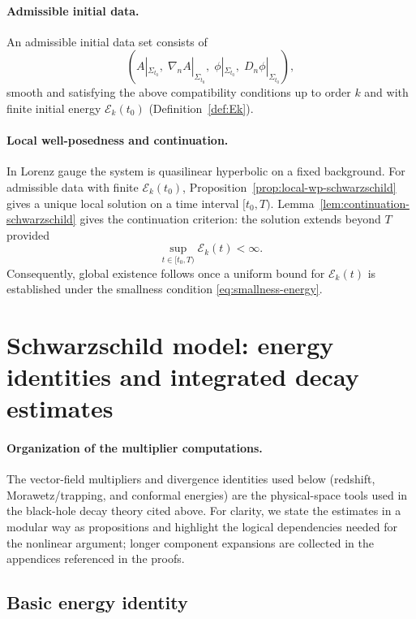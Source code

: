 \documentclass[11pt]{article}
\numberwithin{equation}{section}
\theoremstyle{plain}
\theoremstyle{definition}
\theoremstyle{remark}
\begin{document}
\paragraph{Admissible initial data.}
An admissible initial data set consists of
\begin{equation}
\left(A|_{\Sigma_{t_0}},\; \nabla_n A|_{\Sigma_{t_0}},\;
\phi|_{\Sigma_{t_0}},\; D_n\phi|_{\Sigma_{t_0}}\right),
\end{equation}
smooth and satisfying the above compatibility conditions up to order $k$ and with finite initial energy $\mathcal{E}_k(t_0)$ (Definition~\ref{def:Ek}).

\paragraph{Local well-posedness and continuation.}
In Lorenz gauge the system is quasilinear hyperbolic on a fixed background.
For admissible data with finite $\mathcal{E}_k(t_0)$, Proposition~\ref{prop:local-wp-schwarzschild} gives a unique local solution on a time interval $[t_0,T)$.  Lemma~\ref{lem:continuation-schwarzschild} gives the continuation criterion: the solution extends beyond $T$ provided
\begin{equation}
\sup_{t\in [t_0,T)} \mathcal{E}_k(t) < \infty.
\end{equation}
Consequently, global existence follows once a uniform bound for $\mathcal{E}_k(t)$ is established under the smallness condition \eqref{eq:smallness-energy}.


\section{Schwarzschild model: energy identities and integrated decay estimates}
\label{sec:energy-estimates}

\paragraph{Organization of the multiplier computations.}
The vector-field multipliers and divergence identities used below (redshift, Morawetz/trapping, and conformal energies) are the physical-space tools used in the black-hole decay theory cited above.
For clarity, we state the estimates in a modular way as propositions and highlight the logical dependencies needed for the nonlinear argument; longer component expansions are collected in the appendices referenced in the proofs.


\subsection{Basic energy identity}
\label{subsec:basic-energy}
\end{document}
